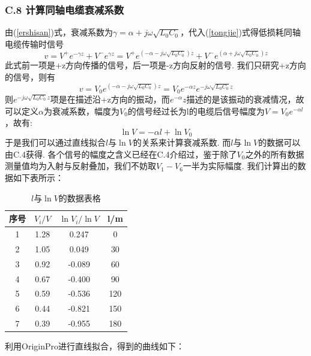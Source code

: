 \documentclass[UTF8]{ctexart}
\begin{document}
\subsubsection*{C.8 计算同轴电缆衰减系数}
由(\ref{ershisan})式，衰减系数为$\gamma=\alpha+j\omega\sqrt{L_0C_0}$，代入(\ref{tongjie})式得低损耗同轴电缆传输时信号
\begin{equation}
v=V^+e^{-\gamma z}+V^-e^{\gamma z}=V^+e^{(-\alpha-j\omega\sqrt{L_0C_0})z}+V^-e^{(\alpha+j\omega\sqrt{L_0C_0})z}
\end{equation}
此式前一项是+z方向传播的信号，后一项是-z方向反射的信号. 我们只研究+z方向的信号，则有
\begin{equation}
    v=V_0e^{(-\alpha-j\omega\sqrt{L_0C_0})z}=V_0e^{-\alpha z}e^{-j\omega\sqrt{L_0C_0}z}
    \label{sanshiliu}
\end{equation}
则$e^{-j\omega\sqrt{L_0C_0}z}$项是在描述沿+z方向的振动，而$e^{-\alpha}z$描述的是该振动的衰减情况，故可以定义$\alpha$为衰减系数，幅度为$V_0$的信号经过长为l的电缆后信号幅度为$V=V_0e^{-\alpha l}$，故有:
\begin{equation}
    \ln{V}=-\alpha l+\ln{V_0}
    \label{sanshiqi}
\end{equation}
于是我们可以通过直线拟合$l$与$\ln{V}$的关系来计算衰减系数. 而$l$与$\ln{V}$的数据可以由C.4获得. 各个信号的幅度之含义已经在C.4介绍过，鉴于除了$V_0$之外的所有数据测量值均为入射与反射叠加，我们不妨取$V_1-V_6$一半为实际幅度. 我们计算出的数据如下表所示：
\begin{table}[H]
    \centering
\begin{tabular}{|c|c|c|c|}
        \hline
        序号&$V_i/V$&$\ln{V_i}/\ln{V}$&l/m\\
        \hline
        1&1.28&0.247&0\\ 
        \hline
        2&1.05&0.049&30\\ 
        \hline
        3&0.92&-0.089&60\\ 
        \hline
        4&0.67&-0.400&90\\ 
        \hline
        5&0.59&-0.536&120\\ 
        \hline
        6&0.44&-0.821&150\\ 
        \hline
        7&0.39&-0.955&180\\ 
        \hline
    \end{tabular}  
    \caption{$l$与$\ln{V}$的数据表格}
\end{table} 
利用OriginPro进行直线拟合，得到的曲线如下：
\end{document}
